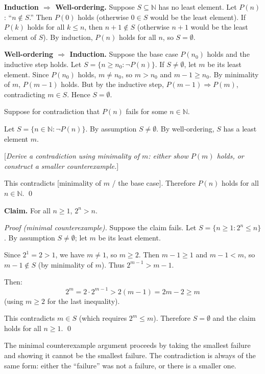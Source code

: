 \begin{remark}
\textbf{Induction $\Rightarrow$ Well-ordering.}
Suppose $S \subseteq \mathbb{N}$ has no least element.
Let $P(n)$: ``$n \notin S$.''
Then $P(0)$ holds (otherwise $0 \in S$ would be the least element).
If $P(k)$ holds for all $k \leq n$, then $n+1 \notin S$ (otherwise
$n+1$ would be the least element of $S$). By induction, $P(n)$ holds
for all $n$, so $S = \emptyset$.

\medskip
\noindent\textbf{Well-ordering $\Rightarrow$ Induction.}
Suppose the base case $P(n_0)$ holds and the inductive step holds.
Let $S = \{n \geq n_0 : \neg P(n)\}$. If $S \neq \emptyset$, let $m$ be
its least element. Since $P(n_0)$ holds, $m \neq n_0$, so $m > n_0$
and $m - 1 \geq n_0$. By minimality of $m$, $P(m-1)$ holds.
But by the inductive step, $P(m-1) \Rightarrow P(m)$, contradicting
$m \in S$. Hence $S = \emptyset$.
\end{remark}

\begin{tcolorbox}[colback=gray!4, colframe=gray!35, arc=2pt,
  left=6pt, right=6pt, top=4pt, bottom=4pt,
  title={\small\textbf{Template: Minimal Counterexample}},
  fonttitle=\small\bfseries]
Suppose for contradiction that $P(n)$ fails for some $n \in \mathbb{N}$.

Let $S = \{n \in \mathbb{N} : \neg P(n)\}$.
By assumption $S \neq \emptyset$.
By well-ordering, $S$ has a least element $m$.

[\emph{Derive a contradiction using minimality of $m$: either show
$P(m)$ holds, or construct a smaller counterexample.}]

This contradicts [minimality of $m$ / the base case].
Therefore $P(n)$ holds for all $n \in \mathbb{N}$. \qed
\end{tcolorbox}

\begin{example}
\textbf{Claim.} For all $n \geq 1$, $2^n > n$.

\medskip
\noindent\textit{Proof (minimal counterexample).}
Suppose the claim fails. Let $S = \{n \geq 1 : 2^n \leq n\}$.
By assumption $S \neq \emptyset$; let $m$ be its least element.

Since $2^1 = 2 > 1$, we have $m \neq 1$, so $m \geq 2$.
Then $m - 1 \geq 1$ and $m - 1 < m$, so $m - 1 \notin S$
(by minimality of $m$). Thus $2^{m-1} > m - 1$.

Then:
\[
2^m = 2 \cdot 2^{m-1} > 2(m-1) = 2m - 2 \geq m
\]
(using $m \geq 2$ for the last inequality).

This contradicts $m \in S$ (which requires $2^m \leq m$).
Therefore $S = \emptyset$ and the claim holds for all $n \geq 1$. \qed

\medskip
\noindent
The minimal counterexample argument proceeds by taking the smallest
failure and showing it cannot be the smallest failure. The contradiction
is always of the same form: either the ``failure'' was not a failure,
or there is a smaller one.
\end{example}
